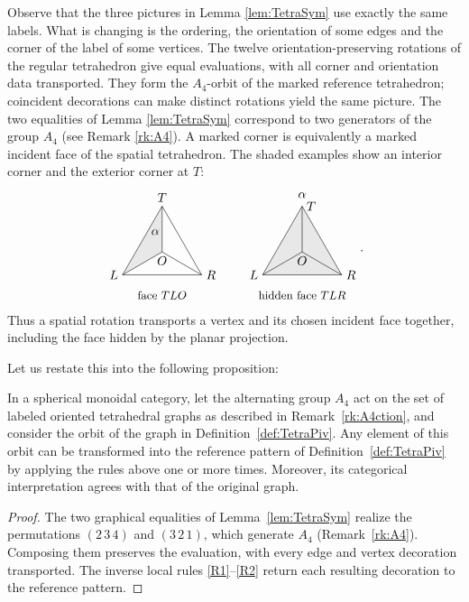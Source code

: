 \documentclass{amsart}
\begin{document}
\begin{remark} \label{rk:A4ction}
Observe that the three pictures in Lemma \ref{lem:TetraSym} use exactly the same labels. What is changing is  the ordering, the orientation of some edges and the corner of the label of some vertices. The twelve orientation-preserving rotations of the regular tetrahedron give equal evaluations, with all corner and orientation data transported. They form the $A_4$-orbit of the marked reference tetrahedron; coincident decorations can make distinct rotations yield the same picture. The two equalities of Lemma \ref{lem:TetraSym} correspond to two generators of the group $A_4$ (see Remark \ref{rk:A4}). A marked corner is equivalently a marked incident face of the spatial
tetrahedron. The shaded examples show an interior corner and the exterior
corner at $T$:
\[
\begin{tikzpicture}[baseline=.65cm,scale=1.1]
\fill[gray!18] (1,1.732)--(0,0)--(1,.577)--cycle;
\draw (0,0)--(2,0)--(1,1.732)--cycle;
\draw (0,0)--(1,.577)--(2,0) (1,.577)--(1,1.732);
\node[above] at (1,1.732) {$T$};\node[left] at (0,0) {$L$};
\node[right] at (2,0) {$R$};\node[below] at (1,.577) {$O$};
\node at (.83,1.08) {$\alpha$};
\node[below] at (1,-.3) {\small face $TLO$};
\end{tikzpicture}
\qquad
\begin{tikzpicture}[baseline=.65cm,scale=1.1]
\fill[gray!18] (1,1.732)--(0,0)--(2,0)--cycle;
\draw (0,0)--(2,0)--(1,1.732)--cycle;
\draw (0,0)--(1,.577)--(2,0) (1,.577)--(1,1.732);
\node[right] at (1,1.732) {$T$};\node[left] at (0,0) {$L$};
\node[right] at (2,0) {$R$};\node[below] at (1,.577) {$O$};
\node[above=3pt] at (1,1.732) {$\alpha$};
\node[below] at (1,-.3) {\small hidden face $TLR$};
\end{tikzpicture}.
\]
Thus a spatial rotation transports a vertex and its chosen incident face
together, including the face hidden by the planar projection.
\end{remark}

Let us restate this into the following proposition:

\begin{proposition} \label{prop:A4Sym}
In a spherical monoidal category, let the alternating group $A_4$ act on the set of labeled oriented tetrahedral graphs as described in Remark~\ref{rk:A4ction}, and consider the orbit of the graph in Definition~\ref{def:TetraPiv}. Any element of this orbit can be transformed into the reference pattern of Definition~\ref{def:TetraPiv} by applying the rules above one or more times. Moreover, its categorical interpretation agrees with that of the original graph.
\end{proposition}
\begin{proof}
The two graphical equalities of Lemma~\ref{lem:TetraSym} realize the
permutations $(2\,3\,4)$ and $(3\,2\,1)$, which generate $A_4$
(Remark~\ref{rk:A4}). Composing them preserves the evaluation, with every
edge and vertex decoration transported. The inverse local rules
\eqref{R1}--\eqref{R2} return each resulting decoration to the reference
pattern.
\end{proof}
\end{document}
